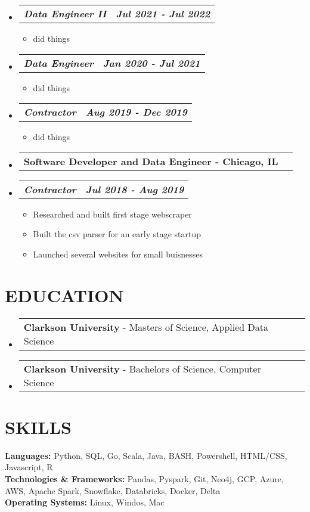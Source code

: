 \documentclass[letterpaper,11pt]{article}
\makeatletter
\newcommand{\resumeItem}[1]{
  \item\small{
    {#1 \vspace{0pt}}
  }
}
\newcommand{\resumeSubheading}[2]{
  \vspace{-1pt}\item
    \begin{tabular*}{0.97\textwidth}[t]{l@{\extracolsep{\fill}}r}
      \textbf{\small#1 - \small#2} 
    \end{tabular*}\vspace{-13pt}
}
\newcommand{\resumeSubSubheading}[2]{
    \item
    \vspace{2pt}
    \begin{tabular*}{0.97\textwidth}{l@{\extracolsep{\fill}}r}
      \textbf{\textit{\small#1}} & \textbf{\textit{\small#2}} \\
    \end{tabular*}\vspace{-5pt}
}
\newcommand{\educationSubheading}[3]{
  \vspace{-2pt}\item
    \begin{tabular*}{0.98\textwidth}[t]{l@{\extracolsep{\fill}}r}
      \textbf{\small#1} - {\small#2} & \textbf{\textit{\small#3}} \\
    \end{tabular*}\vspace{-7pt}
}
\newcommand{\resumeHeadingListStart}{\begin{itemize}[leftmargin=0.05in, label={}]}
\newcommand{\resumeHeadingListEnd}{\end{itemize}}
\newcommand{\resumeSubHeadingListStart}{\begin{itemize}[leftmargin=0.15in, label={}]}
\newcommand{\resumeSubHeadingListEnd}{\end{itemize}\vspace{-10pt}}
\newcommand{\resumeItemListStart}{\begin{itemize}[leftmargin=0.15in]}
\newcommand{\resumeItemListEnd}{\end{itemize}\vspace{-10pt}}
\makeatother
\begin{document}
        \resumeSubHeadingListStart
            \resumeSubSubheading {Data Engineer II}{Jul 2021 - Jul 2022}
            \resumeItemListStart
                \resumeItem{ did things}
            \resumeItemListEnd
        \resumeSubHeadingListEnd
        \resumeSubHeadingListStart
            \resumeSubSubheading {Data Engineer}{Jan 2020 - Jul 2021}
            \resumeItemListStart
                \resumeItem{ did things}
            \resumeItemListEnd
        \resumeSubHeadingListEnd
        \resumeSubHeadingListStart
            \resumeSubSubheading {Contractor}{Aug 2019 - Dec 2019}
            \resumeItemListStart
                \resumeItem{ did things}
            \resumeItemListEnd
        \resumeSubHeadingListEnd
    \resumeHeadingListStart
        \resumeSubheading{Software Developer and Data Engineer}{Chicago, IL}
    \resumeHeadingListEnd
        \resumeSubHeadingListStart
            \resumeSubSubheading {Contractor}{Jul 2018 - Aug 2019}
            \resumeItemListStart
                \resumeItem{Researched and built first stage webscraper}
                \resumeItem{Built the csv parser for an early stage startup}
                \resumeItem{Launched several websites for small buisnesses}
            \resumeItemListEnd
        \resumeSubHeadingListEnd
\section{\textbf{EDUCATION}} 
    \begin{itemize}[leftmargin=0.05in, label={}]
        \educationSubheading{Clarkson University}{Masters of Science, Applied Data Science}{}
        \educationSubheading{Clarkson University}{Bachelors of Science, Computer Science}{}
    \end{itemize}


\section{\textbf{SKILLS}}
    \begin{itemize}[leftmargin=0.05in, label={}]
        \small{\item{
        \textbf{Languages: }{Python, SQL, Go, Scala, Java, BASH, Powershell, HTML/CSS, Javascript, R} \\
        \textbf{Technologies \& Frameworks: }{Pandas, Pyspark, Git, Neo4j, GCP, Azure, AWS, Apache Spark, Snowflake, Databricks, Docker, Delta} \\
        \textbf{Operating Systems: }{Linux, Windos, Mac } \\
        }}
    \end{itemize}


\end{document}
